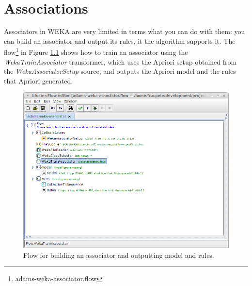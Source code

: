 %

\chapter{Associations}
\label{associations}

Associators in WEKA are very limited in terms what you can do with them: you
can build an associator and output its rules, it the algorithm supports it.
The flow\footnote{adams-weka-associator.flow} in Figure \ref{associator}
shows how to train an associator using the \textit{WekaTrainAssociator}
transformer, which uses the Apriori setup obtained from the \textit{WekaAssociatorSetup}
source, and outputs the Apriori model and the rules that Apriori generated.

\begin{figure}[htb]
  \centering
  \includegraphics[width=12.0cm]{images/associator.png}
  \caption{Flow for building an associator and outputting model and rules.}
  \label{associator}
\end{figure}
